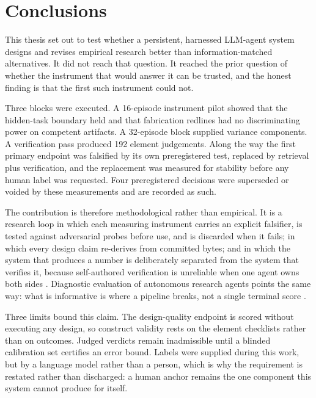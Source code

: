 \documentclass[11pt,a4paper]{article}
\begin{document}
\section{Conclusions}

This thesis set out to test whether a persistent, harnessed LLM-agent system
designs and revises empirical research better than information-matched
alternatives.  It did not reach that question.  It reached the prior question of
whether the instrument that would answer it can be trusted, and the honest
finding is that the first such instrument could not.

Three blocks were executed.  A 16-episode instrument pilot showed that the
hidden-task boundary held and that fabrication redlines had no discriminating
power on competent artifacts.  A 32-episode block supplied variance components.
A verification pass produced 192 element judgements.  Along the way the first
primary endpoint was falsified by its own preregistered test, replaced by
retrieval plus verification, and the replacement was measured for stability
before any human label was requested.  Four preregistered decisions were
superseded or voided by these measurements and are recorded as such.

The contribution is therefore methodological rather than empirical.  It is a
research loop in which each measuring instrument carries an explicit falsifier,
is tested against adversarial probes before use, and is discarded when it fails;
in which every design claim re-derives from committed bytes; and in which the
system that produces a number is deliberately separated from the system that
verifies it, because self-authored verification is unreliable when one agent owns
both sides \citep{verifiergap2026}.  Diagnostic evaluation of autonomous research
agents points the same way: what is informative is where a pipeline breaks, not a
single terminal score \citep{autoresearchfail2026}.

Three limits bound this claim.  The design-quality endpoint is scored without
executing any design, so construct validity rests on the element checklists
rather than on outcomes.  Judged verdicts remain inadmissible until a blinded calibration set certifies an error bound. Labels were supplied during this work, but by a language model rather than a person, which is why the requirement is restated rather than discharged: a human anchor remains the one component this system cannot produce for itself.
\end{document}
